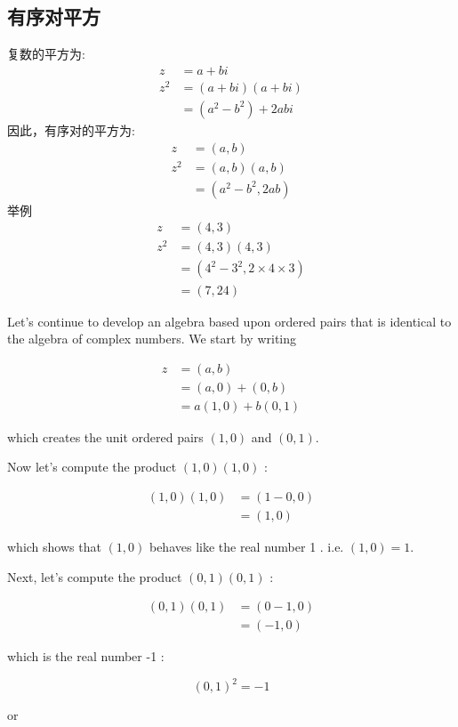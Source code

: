 \subsection{有序对平方}
复数的平方为:
$$
\begin{aligned}
z & =a+b i \\
z^{2} & =(a+b i)(a+b i) \\
& =\left(a^{2}-b^{2}\right)+2 a b i
\end{aligned}
$$
因此，有序对的平方为:
$$
\begin{aligned}
z & =(a, b) \\
z^{2} & =(a, b)(a, b) \\
& =\left(a^{2}-b^{2}, 2 a b\right)
\end{aligned}
$$
举例
$$
\begin{aligned}
z & =(4,3) \\
z^{2} & =(4,3)(4,3) \\
& =\left(4^{2}-3^{2}, 2 \times 4 \times 3\right) \\
& =(7,24)
\end{aligned}
$$

Let's continue to develop an algebra based upon ordered pairs that is identical to the algebra of complex numbers. We start by writing

$$
\begin{aligned}
z & =(a, b) \\
& =(a, 0)+(0, b) \\
& =a(1,0)+b(0,1)
\end{aligned}
$$

which creates the unit ordered pairs $(1,0)$ and $(0,1)$.

Now let's compute the product $(1,0)(1,0)$ :

$$
\begin{aligned}
(1,0)(1,0) & =(1-0,0) \\
& =(1,0)
\end{aligned}
$$

which shows that $(1,0)$ behaves like the real number 1 . i.e. $(1,0)=1$.

Next, let's compute the product $(0,1)(0,1)$ :

$$
\begin{aligned}
(0,1)(0,1) & =(0-1,0) \\
& =(-1,0)
\end{aligned}
$$

which is the real number -1 :

$$
(0,1)^{2}=-1
$$

or

